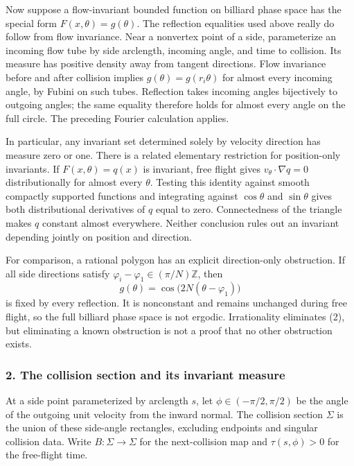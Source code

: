 \documentclass[11pt]{article}
\begin{document}
Now suppose a flow-invariant bounded function on billiard phase space has the special form $F(x,\theta)=g(\theta)$. The reflection equalities used above really do follow from flow invariance. Near a nonvertex point of a side, parameterize an incoming flow tube by side arclength, incoming angle, and time to collision. Its measure has positive density away from tangent directions. Flow invariance before and after collision implies $g(\theta)=g(r_i\theta)$ for almost every incoming angle, by Fubini on such tubes. Reflection takes incoming angles bijectively to outgoing angles; the same equality therefore holds for almost every angle on the full circle. The preceding Fourier calculation applies.

In particular, any invariant set determined solely by velocity direction has measure zero or one. There is a related elementary restriction for position-only invariants. If $F(x,\theta)=q(x)$ is invariant, free flight gives $v_\theta\cdot\nabla q=0$ distributionally for almost every $\theta$. Testing this identity against smooth compactly supported functions and integrating against $\cos\theta$ and $\sin\theta$ gives both distributional derivatives of $q$ equal to zero. Connectedness of the triangle makes $q$ constant almost everywhere. Neither conclusion rules out an invariant depending jointly on position and direction.

For comparison, a rational polygon has an explicit direction-only obstruction. If all side directions satisfy $\varphi_i-\varphi_1\in(\pi/N)\mathbb Z$, then
\[
 g(\theta)=\cos\bigl(2N(\theta-\varphi_1)\bigr)
                                                               \tag{2}
\]
is fixed by every reflection. It is nonconstant and remains unchanged during free flight, so the full billiard phase space is not ergodic. Irrationality eliminates (2), but eliminating a known obstruction is not a proof that no other obstruction exists.

\subsubsection{2. The collision section and its invariant measure}
At a side point parameterized by arclength $s$, let $\phi\in(-\pi/2,\pi/2)$ be the angle of the outgoing unit velocity from the inward normal. The collision section $\Sigma$ is the union of these side-angle rectangles, excluding endpoints and singular collision data. Write $B:\Sigma\to\Sigma$ for the next-collision map and $\tau(s,\phi)>0$ for the free-flight time.
\end{document}
